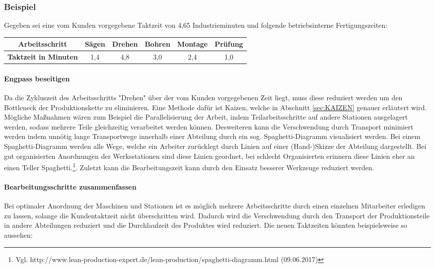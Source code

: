 \documentclass[00_ToyotaProduktionssystem.tex]{subfiles}
\begin{document}
\subsubsection{Beispiel}
Gegeben sei eine vom Kunden vorgegebene Taktzeit von 4,65 Industrieminuten und folgende betriebsinterne Fertigungszeiten:
\begin{center}
\begin{tabular}{|>{\bfseries}c|c|c|c|c|c|}
\hline
Arbeitsschritt & Sägen & Drehen & Bohren & Montage & Prüfung \\
\hline
Taktzeit in Minuten & 1,4 & 4,8 & 3,0 & 2,4 & 1,0 \\
\hline
\end{tabular}
\end{center}
\paragraph{Engpass beseitigen}
Da die Zykluszeit des Arbeitsschritts "Drehen" über der vom Kunden vorgegebenen Zeit liegt, muss diese reduziert werden um den Bottleneck der Produktionskette zu eliminieren. Eine Methode dafür ist Kaizen, welche in Abschnitt \ref{sec:KAIZEN} genauer erläutert wird. Mögliche Maßnahmen wären zum Beispiel die Parallelisierung der Arbeit, indem Teilarbeitsschritte auf andere Stationen ausgelagert werden, sodass mehrere Teile gleichzeitig verarbeitet werden können. Desweiteren kann die Verschwendung durch Transport minimiert werden indem unnötig lange Transportwege innerhalb einer Abteilung durch ein sog. Spaghetti-Diagramm visualisiert werden. Bei einem Spaghetti-Diagramm werden alle Wege, welche ein Arbeiter zurücklegt durch Linien auf einer (Hand-)Skizze der Abteilung dargestellt. Bei gut organisierten Anordnungen der Werksstationen sind diese Linien geordnet, bei schlecht Organisierten erinnern diese Linien eher an einen Teller Spaghetti.\footnote{Vgl. http://www.lean-production-expert.de/lean-production/spaghetti-diagramm.html (09.06.2017)}. Zuletzt kann die Bearbeitungszeit kann durch den Einsatz besserer Werkzeuge reduziert werden.
\paragraph{Bearbeitungsschritte zusammenfassen}
Bei optimaler Anordnung der Maschinen und Stationen ist es möglich mehrere Arbeitsschritte durch einen einzelnen Mitarbeiter erledigen zu lassen, solange die Kundentaktzeit nicht überschritten wird. Dadurch wird die Verschwendung durch den Transport der Produktionsteile in andere Abteilungen reduziert und die Durchlaufzeit des Produktes wird reduziert. Die neuen Taktzeiten könnten beispielsweise so aussehen:
\end{document}
